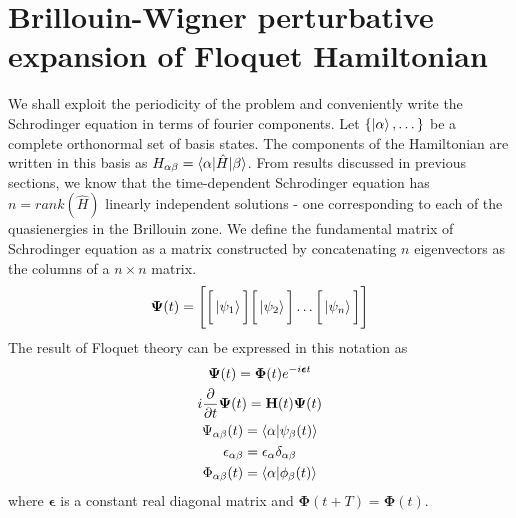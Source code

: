\section{Brillouin-Wigner perturbative expansion of Floquet Hamiltonian}
We shall exploit the periodicity of the problem and conveniently write the Schrodinger equation in terms of fourier components. Let $\{\ket{\alpha},\dots\}$ be a complete 
orthonormal set of basis states. The components of the Hamiltonian are written in this basis as $H_{\alpha\beta}=\braket{\alpha|\hat{H}|\beta}$. From results discussed in
previous sections, we know that the time-dependent Schrodinger equation has $n=rank(\hat{H})$ linearly independent solutions - one corresponding to each of the quasienergies 
in the Brillouin zone. We define the fundamental matrix of Schrodinger equation as a matrix constructed by concatenating $n$ eigenvectors as the columns of a $n \times n$ matrix.
\begin{equation*}
 \bm{\Psi}(t) = \Bigg[ \bigg[\ket{\psi_1}\bigg] \bigg[\ket{\psi_2}\bigg]\dots\bigg[\ket{\psi_n}\bigg] \Bigg]
\end{equation*}
The result of Floquet theory can be expressed in this notation as
\begin{gather}
 \bm{\Psi}(t) = \bm{\Phi}(t) e^{-i\bm{\epsilon} t} \\
 i\frac{\partial}{\partial t} \bm{\Psi}(t) = \mathbf{H}(t)\bm{\Psi}(t) \\
 \Psi_{\alpha\beta}(t) = \braket{\alpha|\psi_{\beta}(t)} \\
 \epsilon_{\alpha\beta} = \epsilon_\alpha \delta_{\alpha\beta} \\
 \Phi_{\alpha\beta}(t) = \braket{\alpha|\phi_{\beta}(t)}
\end{gather}
where $\bm{\epsilon}$ is a constant real diagonal matrix and $\bm{\Phi}(t+T)=\bm{\Phi}(t)$.

